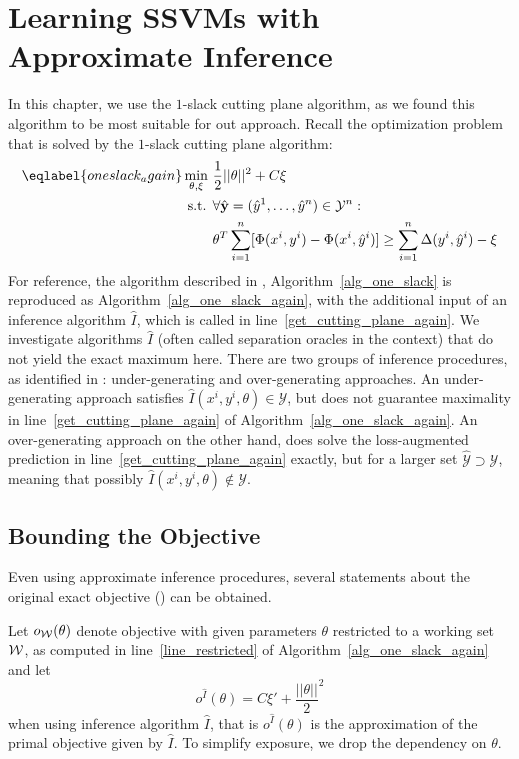 \section{Learning SSVMs with Approximate Inference}
In this chapter, we use the $1$-slack cutting plane algorithm, as we found this
algorithm to be most suitable for out approach. Recall the optimization problem
that is solved by the $1$-slack cutting plane algorithm:
\begin{align}\eqlabel{oneslack_again}
    \min_{\theta, \xi}\ &\frac{1}{2} ||\theta||^2 + C \xi\\
    \text{s.t. }&\forall \hat{\mathbf{y}}=(\hat{y}^1, \dots, \hat{y}^n) \in \mathcal{Y}^n:\\
        &\theta^T \sum_{i=1}^n [\Phi(x^i, y^i) - \Phi(x^i,
            \hat{y}^i)] \geq \sum_{i=1}^n \Delta(y^i, \hat{y}^i)
            - \xi
\end{align}
For reference, the algorithm described in
, Algorithm~\ref{alg_one_slack} is reproduced as
Algorithm~\ref{alg_one_slack_again}, with the additional input of an inference algorithm $\hat{I}$, which is called in
line~\ref{get_cutting_plane_again}. We investigate algorithms $\hat{I}$ (often called
separation
oracles in the context) that do not yield the exact maximum here.
There are two groups of inference procedures, as identified in
\citet{finley2008training}: under-generating and over-generating approaches.
An under-generating approach satisfies $\hat{I}(x^i, y^i, \theta) \in
\mathcal{Y}$, but does not guarantee maximality in line~\ref{get_cutting_plane_again}
of Algorithm~\ref{alg_one_slack_again}. An over-generating approach on the other
hand, does solve the loss-augmented prediction in line~\ref{get_cutting_plane_again}
exactly, but for a larger set $\hat{\mathcal{Y}} \supset \mathcal{Y}$, meaning
that possibly $\hat{I}(x^i, y^i, \theta) \notin \mathcal{Y}$.

\subsection{Bounding the Objective}
Even using approximate inference procedures, several statements
about the original exact objective () can be
obtained.

Let $o_{\mathcal{W}}(\theta)$ denote objective  with
given parameters $\theta$ restricted to a working set $\mathcal{W}$, as computed in
line~\ref{line_restricted} of Algorithm~\ref{alg_one_slack_again} and  let
\[
    o^{\hat{I}}(\theta) = C\xi' + \frac{||\theta||}{2}^2
\]
when using inference algorithm $\hat{I}$, that is $o^{\hat{I}}(\theta)$ is the approximation of the primal
objective given by $\hat{I}$. To simplify exposure, we drop the dependency on $\theta$.

